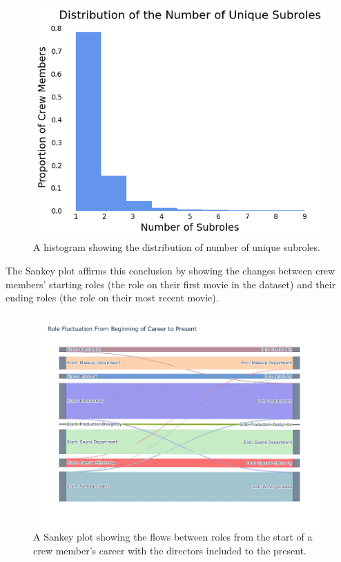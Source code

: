 \documentclass[12pt]{article}
\begin{document}
\begin{figure}[H]
    \centering
    \includegraphics[clip,scale=0.7] {2_histnumsubroles.png}
    \caption{A histogram showing the distribution of number of unique subroles.}
    \label{fig:sankey}
\end{figure}


The Sankey plot affirms this conclusion by showing the changes between crew members' starting roles (the role on their first movie in the dataset) and their ending roles (the role on their most recent movie). 

\begin{figure}[H]
    \centering
    \includegraphics[clip,scale=0.5] {2_sankeyplot.png}
    \caption{A Sankey plot showing the flows between roles from the start of a crew member's career with the directors included to the present.}
    \label{fig:sankey}
\end{figure}
\end{document}
